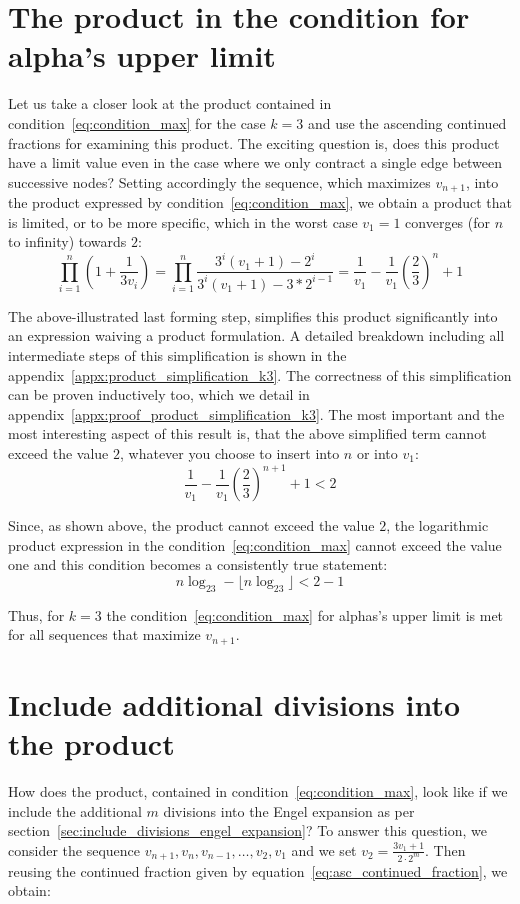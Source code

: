 \documentclass[12pt]{amsart}
\theoremstyle{definition}
\begin{document}
\section{The product in the condition for alpha's upper limit}
Let us take a closer look at the product contained in condition~\ref{eq:condition_max} for the case $k=3$ and use the ascending continued fractions for examining this product. The exciting question is, does this product have a limit value even in the case where we only contract a single edge between successive nodes? Setting accordingly the sequence, which maximizes $v_{n+1}$, into the product expressed by condition~\ref{eq:condition_max}, we obtain a product that is limited, or to be more specific, which in the worst case $v_1=1$ converges (for $n$ to infinity) towards $2$:
\begin{equation}
\label{eq:product_simplification_k3}
\prod_{i=1}^{n}\left(1+\frac{1}{3v_{i}}\right)
=\prod_{i=1}^{n}\frac{3^i(v_1+1)-2^i}{3^i(v_1+1)-3*2^{i-1}}
=\frac{1}{v_1}-\frac{1}{v_1}\left(\frac{2}{3}\right)^n+1
\end{equation}

The above-illustrated last forming step, simplifies this product significantly into an expression waiving a product formulation. A detailed breakdown including all intermediate steps of this simplification is shown in the appendix~\ref{appx:product_simplification_k3}. The correctness of this simplification can be proven inductively too, which we detail in appendix~\ref{appx:proof_product_simplification_k3}. The most important and the most interesting aspect of this result is, that the above simplified term cannot exceed the value $2$, whatever you choose to insert into $n$ or into $v_1$:
\[
\frac{1}{v_1}-\frac{1}{v_1}\left(\frac{2}{3}\right)^{n+1}+1<2
\]

Since, as shown above, the product cannot exceed the value $2$, the logarithmic product expression in the condition~\ref{eq:condition_max} cannot exceed the value one and this condition becomes a consistently true statement:
\[
n\log_23-\lfloor n\log_23\rfloor<2-1
\]

Thus, for $k=3$ the condition~\ref{eq:condition_max} for alphas's upper limit is met for all sequences that maximize $v_{n+1}$.

\section{Include additional divisions into the product}
How does the product, contained in condition~\ref{eq:condition_max}, look like if we include the additional $m$ divisions into the Engel expansion as per section~\ref{sec:include_divisions_engel_expansion}? To answer this question, we consider the sequence $v_{n+1},v_n,v_{n-1},\ldots,v_2,v_1$ and we set $v_2=\frac{3v_1+1}{2\cdot2^{m}}$. Then reusing the continued fraction given by equation~\ref{eq:asc_continued_fraction}, we obtain:
\end{document}
